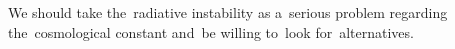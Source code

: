 
We should take the~radiative instability as a~serious problem regarding the~cosmological constant and~be willing to~look for~alternatives.%

